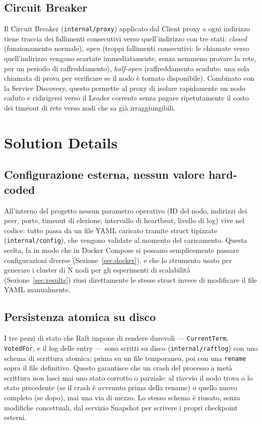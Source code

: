 \documentclass[conference]{IEEEtran}
\begin{document}
\subsection{Circuit Breaker}

Il Circuit Breaker (\texttt{internal/proxy}) applicato dal Client
proxy a ogni indirizzo tiene traccia dei fallimenti consecutivi verso
quell'indirizzo con tre stati: \emph{closed} (funzionamento normale),
\emph{open} (troppi fallimenti consecutivi: le chiamate verso quell'indirizzo
vengono scartate immediatamente, senza nemmeno provare la rete, per un
periodo di raffreddamento), \emph{half-open} (raffreddamento scaduto: una
sola chiamata di prova per verificare se il nodo è tornato disponibile).
Combinato con la Service Discovery, questo permette al proxy di isolare
rapidamente un nodo caduto e ridirigersi verso il Leader corrente senza
pagare ripetutamente il costo dei timeout di rete verso nodi che sa già
irraggiungibili.

\section{Solution Details}
\label{sec:details}

\subsection{Configurazione esterna, nessun valore hard-coded}

All'interno del progetto nessun parametro operativo (ID del nodo,
indirizzi dei peer, porte, timeout di elezione, intervallo di heartbeat,
livello di log) vive nel codice: tutto passa da un file YAML caricato
tramite struct tipizzate (\texttt{internal/config}), che vengono validate al momento del caricamento. Questa scelta, fa in modo che in Docker Compose si possano semplicemente passare configurazioni diverse
(Sezione~\ref{sec:docker}), e che lo strumento usato per generare i cluster di
N nodi per gli esperimenti di scalabilità (Sezione~\ref{sec:results}) riusi
direttamente le stesse struct invece di modificare il file YAML manualmente.

\subsection{Persistenza atomica su disco}

I tre pezzi di stato che Raft impone di rendere durevoli —
\texttt{CurrentTerm}, \texttt{VotedFor}, e il log delle entry — sono
scritti su disco (\texttt{internal/raftlog}) con uno schema di scrittura
atomica: prima su un file temporaneo, poi con una \texttt{rename} sopra il
file definitivo. Questo garantisce che un crash del processo a metà
scrittura non lasci mai uno stato corrotto o parziale: al riavvio il nodo
trova o lo stato precedente (se il crash è avvenuto prima della rename) o
quello nuovo completo (se dopo), mai una via di mezzo. Lo stesso schema è
riusato, senza modifiche concettuali, dal servizio Snapshot per scrivere i
propri checkpoint esterni.
\end{document}
